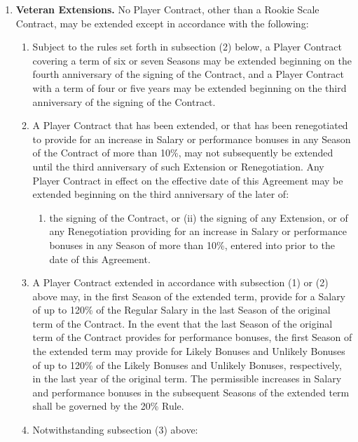\documentclass[
]{book}
\providecommand{\tightlist}{%
  \setlength{\itemsep}{0pt}\setlength{\parskip}{0pt}}
\begin{document}
\begin{enumerate}
\def\labelenumi{(\alph{enumi})}
\tightlist
\item
  \textbf{Veteran Extensions.} No Player Contract, other than a Rookie Scale Contract, may be extended except in accordance with the following:

  \begin{enumerate}
  \def\labelenumii{(\arabic{enumii})}
  \tightlist
  \item
    Subject to the rules set forth in subsection (2) below, a Player Contract covering a term of six or seven Seasons may be extended beginning on the fourth anniversary of the signing of the Contract, and a Player Contract with a term of four or five years may be extended beginning on the third anniversary of the signing of the Contract.
  \item
    A Player Contract that has been extended, or that has been renegotiated to provide for an increase in Salary or performance bonuses in any Season of the Contract of more than 10\%, may not subsequently be extended until the third anniversary of such Extension or Renegotiation. Any Player Contract in effect on the effective date of this Agreement may be extended beginning on the third anniversary of the later of:

    \begin{enumerate}
    \def\labelenumiii{(\roman{enumiii})}
    \tightlist
    \item
      the signing of the Contract, or (ii) the signing of any Extension, or of any Renegotiation providing for an increase in Salary or performance bonuses in any Season of more than 10\%, entered into prior to the date of this Agreement.
    \end{enumerate}
  \item
    A Player Contract extended in accordance with subsection (1) or (2) above may, in the first Season of the extended term, provide for a Salary of up to 120\% of the Regular Salary in the last Season of the original term of the Contract. In the event that the last Season of the original term of the Contract provides for performance bonuses, the first Season of the extended term may provide for Likely Bonuses and Unlikely Bonuses of up to 120\% of the Likely Bonuses and Unlikely Bonuses, respectively, in the last year of the original term. The permissible increases in Salary and performance bonuses in the subsequent Seasons of the extended term shall be governed by the 20\% Rule.
  \item
    Notwithstanding subsection (3) above:


\end{enumerate}
\end{enumerate}
\end{document}
